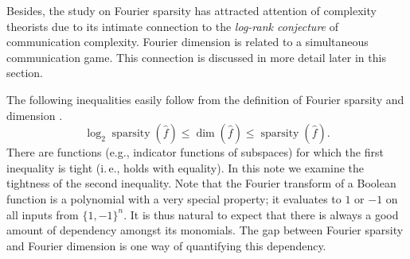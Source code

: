 \documentclass[11pt]{article}
\numberwithin{equation}{section}
\theoremstyle{definition}
\theoremstyle{plain}
\newcommand{\ie}{i.\,e.}
\DeclareMathOperator{\spa}{sparsity}
\DeclareMathOperator{\dimn}{dim}
\begin{document}
Besides, the study on Fourier sparsity has attracted attention of complexity theorists due to its intimate connection to the \textit{log-rank conjecture} of communication complexity. Fourier dimension is related to a simultaneous communication game. This connection is discussed in more detail later in this section.

The following inequalities easily follow from the definition of Fourier sparsity and dimension%
.
\begin{equation}
\label{eq:order}
 \log_2 \spa(\widehat{f}) \leq \dimn(\widehat{f}) \leq \spa(\widehat{f}).
\end{equation}
There are functions (e.g., indicator functions of subspaces) for which
the first inequality is tight (\ie, %
holds with equality). In this
%
note   %
we examine the tightness of the second inequality. Note that the Fourier
transform of a Boolean function is a polynomial with a very special
%
property;     %
it evaluates to $1$ or $-1$ on all inputs from $\{1,-1\}^n$. It is thus natural to expect that there is always a good amount of dependency amongst its monomials. The gap between Fourier sparsity and Fourier dimension is one way of quantifying this dependency.
\end{document}
